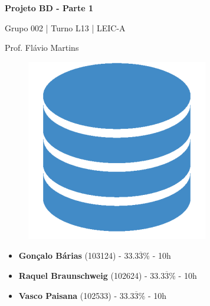 \documentclass[12pt,a4paper]{article}
\begin{document}
  \begin{titlepage}
    \begin{center}
      \vspace*{5cm}

      \Huge
      \textbf{Projeto BD - Parte 1}

      \vspace{0.5cm}
      \LARGE
      Grupo 002 | Turno L13 | LEIC-A

      \vspace{0.5cm}
      \large
      Prof. Flávio Martins

      \vspace{0.5cm}
      \begin{figure}[h]
          \centering
          \includegraphics[scale=0.5]{report_logo.png}
      \end{figure}

      \vfill

      \large
      \begin{minipage}{0.8\textwidth}
        \begin{itemize}
          \item[] \textbf{Gonçalo Bárias} (103124) - 33.3$\overline{3}$\% - 10h
          \item[] \textbf{Raquel Braunschweig} (102624) - 33.3$\overline{3}$\% - 10h
          \item[] \textbf{Vasco Paisana} (102533) - 33.3$\overline{3}$\% - 10h
        \end{itemize}
      \end{minipage}
    \end{center}
  \end{titlepage}

  \begin{landscape}
    \centering
    
  \end{landscape}
\end{document}
